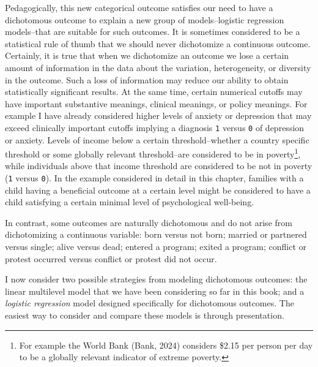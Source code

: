 \documentclass[
  letterpaper,
  DIV=11,
  numbers=noendperiod]{scrreprt}
\begin{document}
Pedagogically, this new categorical outcome satisfies our need to have a
dichotomous outcome to explain a new group of models--logistic
regression models--that are suitable for such outcomes. It is sometimes
considered to be a statistical rule of thumb that we should never
dichotomize a continuous outcome. Certainly, it is true that when we
dichotomize an outcome we lose a certain amount of information in the
data about the variation, heterogeneity, or diversity in the outcome.
Such a loss of information may reduce our ability to obtain
statistically significant results. At the same time, certain numerical
cutoffs may have important substantive meanings, clinical meanings, or
policy meanings. For example I have already considered higher levels of
anxiety or depression that may exceed clinically important cutoffs
implying a diagnosis \texttt{1} versus \texttt{0} of depression or
anxiety. Levels of income below a certain threshold--whether a country
specific threshold or some globally relevant threshold--are considered
to be in poverty\footnote{For example the World Bank (Bank, 2024)
  considers \$2.15 per person per day to be a globally relevant
  indicator of extreme poverty.}, while individuals above that income
threshold are considered to be not in poverty (\texttt{1} versus
\texttt{0}). In the example considered in detail in this chapter,
families with a child having a beneficial outcome at a certain level
might be considered to have a child satisfying a certain minimal level
of psychological well-being.

In contrast, some outcomes are naturally dichotomous and do not arise
from dichotomizing a continuous variable: born versus not born; married
or partnered versus single; alive versus dead; entered a program; exited
a program; conflict or protest occurred versus conflict or protest did
not occur.

I now consider two possible strategies from modeling dichotomous
outcomes: the linear multilevel model that we have been considering so
far in this book; and a \emph{logistic regression} model designed
specifically for dichotomous outcomes. The easiest way to consider and
compare these models is through presentation.
\end{document}
